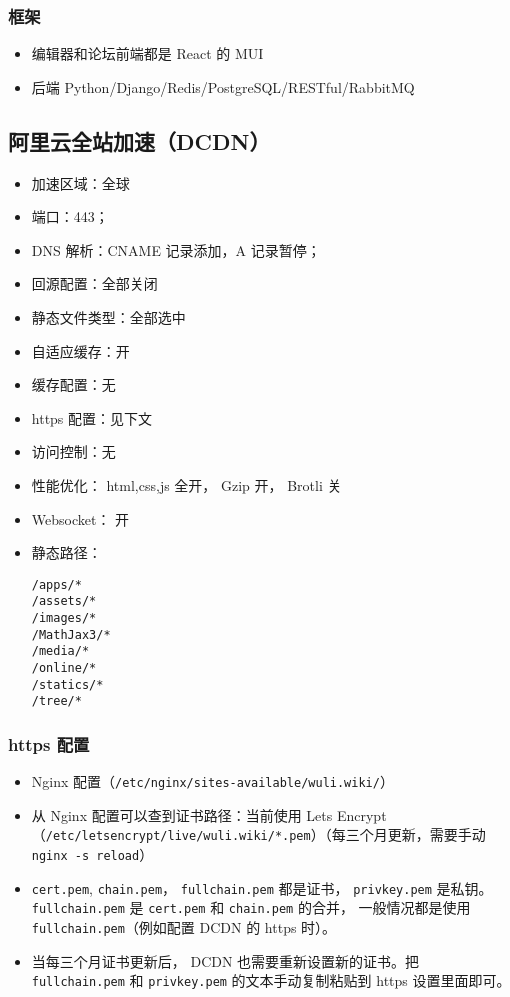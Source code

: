 \subsubsection{框架}
\begin{itemize}
\item 编辑器和论坛前端都是 React 的 MUI
\item 后端 Python/Django/Redis/PostgreSQL/RESTful/RabbitMQ
\end{itemize}

\subsection{阿里云全站加速（DCDN）}
\begin{itemize}
\item 加速区域：全球
\item 端口：443；
\item DNS 解析：CNAME 记录添加，A 记录暂停；
\item 回源配置：全部关闭
\item 静态文件类型：全部选中
\item 自适应缓存：开
\item 缓存配置：无
\item https 配置：见下文
\item 访问控制：无
\item 性能优化： html,css,js 全开， Gzip 开， Brotli 关
\item Websocket： 开
\item 静态路径：
\begin{lstlisting}[language=none]
/apps/*
/assets/*
/images/*
/MathJax3/*
/media/*
/online/*
/statics/*
/tree/*
\end{lstlisting}
\end{itemize}

\subsubsection{https 配置}
\begin{itemize}
\item Nginx 配置（\verb`/etc/nginx/sites-available/wuli.wiki/`）
\item 从 Nginx 配置可以查到证书路径：当前使用 Lets Encrypt （\verb`/etc/letsencrypt/live/wuli.wiki/*.pem`）（每三个月更新，需要手动 \verb`nginx -s reload`）
\item \verb`cert.pem`, \verb`chain.pem`， \verb`fullchain.pem` 都是证书， \verb`privkey.pem` 是私钥。 \verb`fullchain.pem` 是 \verb`cert.pem` 和 \verb`chain.pem` 的合并， 一般情况都是使用 \verb`fullchain.pem`（例如配置 DCDN 的 https 时）。
\item 当每三个月证书更新后， DCDN 也需要重新设置新的证书。把 \verb`fullchain.pem` 和 \verb`privkey.pem` 的文本手动复制粘贴到 https 设置里面即可。
\end{itemize}
